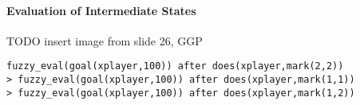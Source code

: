 \paragraph{Evaluation of Intermediate States}
TODO insert image from slide 26, GGP

\begin{lstlisting}
fuzzy_eval(goal(xplayer,100)) after does(xplayer,mark(2,2))
> fuzzy_eval(goal(xplayer,100)) after does(xplayer,mark(1,1))
> fuzzy_eval(goal(xplayer,100)) after does(xplayer,mark(1,2))
\end{lstlisting}
